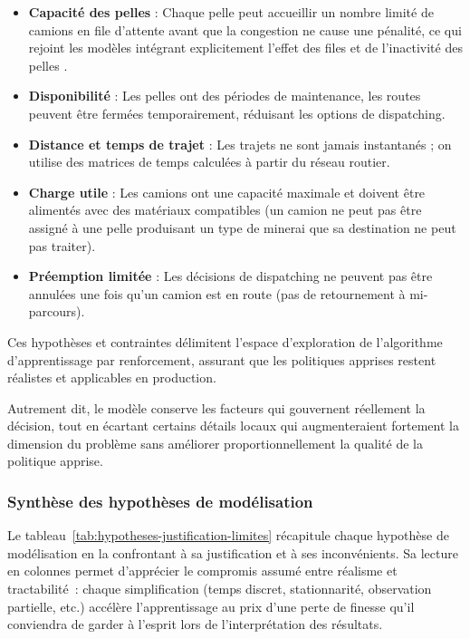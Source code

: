 \documentclass[11pt,a4paper]{report}
\begin{document}
\begin{itemize}
    \item \textbf{Capacité des pelles} : Chaque pelle peut accueillir un nombre limité de camions en file d'attente avant que la congestion ne cause une pénalité, ce qui rejoint les modèles intégrant explicitement l'effet des files et de l'inactivité des pelles \cite{ChungHTa2013}.
    
    \item \textbf{Disponibilité} : Les pelles ont des périodes de maintenance, les routes peuvent être fermées temporairement, réduisant les options de dispatching.
    
    \item \textbf{Distance et temps de trajet} : Les trajets ne sont jamais instantanés ; on utilise des matrices de temps calculées à partir du réseau routier.
    
    \item \textbf{Charge utile} : Les camions ont une capacité maximale et doivent être alimentés avec des matériaux compatibles (un camion ne peut pas être assigné à une pelle produisant un type de minerai que sa destination ne peut pas traiter).
    
    \item \textbf{Préemption limitée} : Les décisions de dispatching ne peuvent pas être annulées une fois qu'un camion est en route (pas de retournement à mi-parcours).
\end{itemize}

Ces hypothèses et contraintes délimitent l'espace d'exploration de l'algorithme d'apprentissage par renforcement, assurant que les politiques apprises restent réalistes et applicables en production.

Autrement dit, le modèle conserve les facteurs qui gouvernent réellement la décision, tout en écartant certains détails locaux qui augmenteraient fortement la dimension du problème sans améliorer proportionnellement la qualité de la politique apprise.

\subsubsection*{Synthèse des hypothèses de modélisation}

Le tableau~\ref{tab:hypotheses-justification-limites} r\'ecapitule chaque hypoth\`ese de mod\'elisation en la confrontant \`a sa justification et \`a ses inconv\'enients. Sa lecture en colonnes permet d'appr\'ecier le compromis assum\'e entre r\'ealisme et tractabilit\'e~: chaque simplification (temps discret, stationnarit\'e, observation partielle, etc.) acc\'el\`ere l'apprentissage au prix d'une perte de finesse qu'il conviendra de garder \`a l'esprit lors de l'interpr\'etation des r\'esultats.
\end{document}
